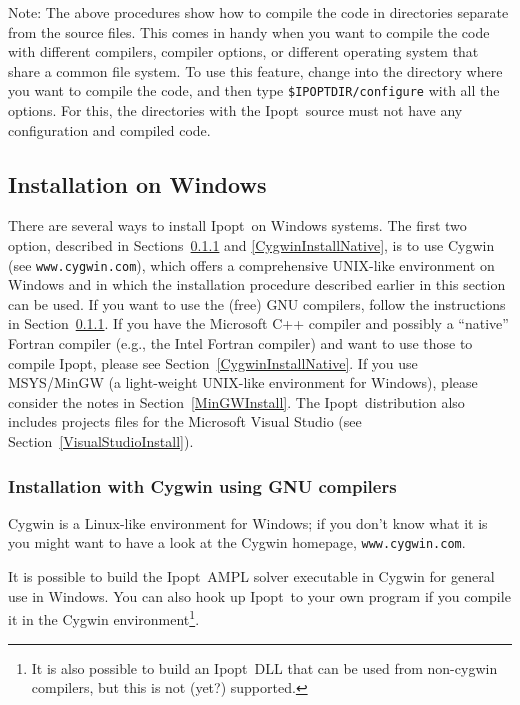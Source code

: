 \documentclass[10pt]{article}
\newcommand{\Ipopt}{{\sc Ipopt}}
\begin{document}
Note: The above procedures show how to compile the code in directories
separate from the source files.  This comes in handy when you want to
compile the code with different compilers, compiler options, or
different operating system that share a common file system.  To use
this feature, change into the directory where you want to compile the
code, and then type {\tt \$IPOPTDIR/configure} with all the options.
For this, the directories with the \Ipopt\ source must not have any
configuration and compiled code.

\subsection{Installation on Windows}\label{WindowsInstall}

There are several ways to install \Ipopt\ on Windows systems.  The
first two option, described in Sections~\ref{CygwinInstall} and
\ref{CygwinInstallNative}, is to use Cygwin (see
\texttt{www.cygwin.com}), which offers a comprehensive UNIX-like
environment on Windows and in which the installation procedure
described earlier in this section can be used.  If you want to use the
(free) GNU compilers, follow the instructions in
Section~\ref{CygwinInstall}.  If you have the Microsoft C++ compiler
and possibly a ``native'' Fortran compiler (e.g., the Intel Fortran
compiler) and want to use those to compile \Ipopt, please see
Section~\ref{CygwinInstallNative}.  If you use MSYS/MinGW (a
light-weight UNIX-like environment for Windows), please consider the
notes in Section~\ref{MinGWInstall}.
%
The \Ipopt\ distribution also includes projects files for the
Microsoft Visual Studio (see Section~\ref{VisualStudioInstall}).

\subsubsection{Installation with Cygwin using GNU compilers}\label{CygwinInstall}

Cygwin is a Linux-like environment for Windows; if you don't know what
it is you might want to have a look at the Cygwin homepage,
\texttt{www.cygwin.com}.

It is possible to build the \Ipopt\ AMPL solver executable in Cygwin
for general use in Windows.  You can also hook up \Ipopt\ to your own
program if you compile it in the Cygwin environment\footnote{It is
  also possible to build an \Ipopt\ DLL that can be used from
  non-cygwin compilers, but this is not (yet?) supported.}.
\end{document}
